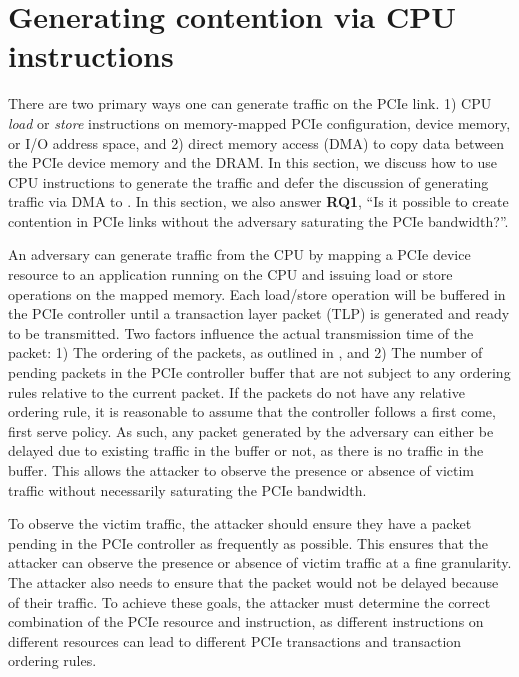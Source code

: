 \section{Generating contention via CPU instructions}
\label{sec:interconnect-sc-store-ops}

There are two primary ways one can generate traffic on the PCIe link.
1) CPU \textit{load} or \textit{store} instructions on memory-mapped PCIe configuration, device memory, or I/O address space, and 
2) direct memory access (DMA) to copy data between the PCIe device memory and the DRAM.
In this section, we discuss how to use CPU instructions to generate the traffic and defer the discussion of generating traffic via DMA to .
In this section, we also answer \textbf{RQ1}, ``Is it possible to create contention in PCIe links without the adversary saturating the PCIe bandwidth?''.

An adversary can generate traffic from the CPU by mapping a PCIe device resource to an application running on the CPU and issuing load or store operations on the mapped memory.
Each load/store operation will be buffered in the PCIe controller until a transaction layer packet (TLP) is generated and ready to be transmitted.
Two factors influence the actual transmission time of the packet:
1) The ordering of the packets, as outlined in , and
2) The number of pending packets in the PCIe controller buffer that are not subject to any ordering rules relative to the current packet.
If the packets do not have any relative ordering rule, it is reasonable to assume that the controller follows a first come, first serve policy.
As such, any packet generated by the adversary can either be delayed due to existing traffic in the buffer or not, as there is no traffic in the buffer.
This allows the attacker to observe the presence or absence of victim traffic without necessarily saturating the PCIe bandwidth.

To observe the victim traffic, the attacker should ensure they have a packet pending in the PCIe controller as frequently as possible.
This ensures that the attacker can observe the presence or absence of victim traffic at a fine granularity.
The attacker also needs to ensure that the packet would not be delayed because of their traffic.
To achieve these goals, the attacker must determine the correct combination of the PCIe resource and instruction, as different instructions on different resources can lead to different PCIe transactions and transaction ordering rules.




% 
 